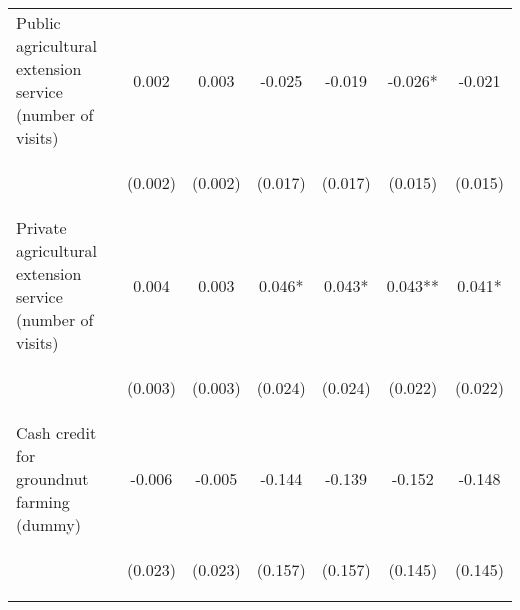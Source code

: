 \begin{center}
\begin{tabular}{lcccccc}
Public agricultural extension service (number of visits) & 0.002 & 0.003 & -0.025 & -0.019 & -0.026* & -0.021 \\
\vspace{4pt} & \begin{footnotesize}(0.002)\end{footnotesize} & \begin{footnotesize}(0.002)\end{footnotesize} & \begin{footnotesize}(0.017)\end{footnotesize} & \begin{footnotesize}(0.017)\end{footnotesize} & \begin{footnotesize}(0.015)\end{footnotesize} & \begin{footnotesize}(0.015)\end{footnotesize} \\
Private agricultural extension service (number of visits) & 0.004 & 0.003 & 0.046* & 0.043* & 0.043** & 0.041* \\
\vspace{4pt} & \begin{footnotesize}(0.003)\end{footnotesize} & \begin{footnotesize}(0.003)\end{footnotesize} & \begin{footnotesize}(0.024)\end{footnotesize} & \begin{footnotesize}(0.024)\end{footnotesize} & \begin{footnotesize}(0.022)\end{footnotesize} & \begin{footnotesize}(0.022)\end{footnotesize} \\
Cash credit for groundnut farming (dummy) & -0.006 & -0.005 & -0.144 & -0.139 & -0.152 & -0.148 \\
\vspace{4pt} & \begin{footnotesize}(0.023)\end{footnotesize} & \begin{footnotesize}(0.023)\end{footnotesize} & \begin{footnotesize}(0.157)\end{footnotesize} & \begin{footnotesize}(0.157)\end{footnotesize} & \begin{footnotesize}(0.145)\end{footnotesize} & \begin{footnotesize}(0.145)\end{footnotesize} \\

\end{tabular}
\end{center}
